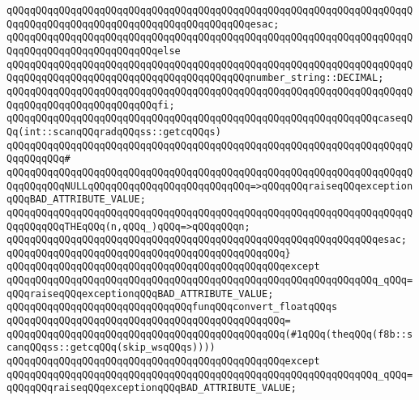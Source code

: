 \verb|qQQqqQQqqQQqqQQqqQQqqQQqqQQqqQQqqQQqqQQqqQQqqQQqqQQqqQQqqQQqqQQqqQQqqQQqqQQqqQQqqQQqqQQqqQQqqQQqqQQqqQQqqQQqqQQqesac;|\newline
\verb|qQQqqQQqqQQqqQQqqQQqqQQqqQQqqQQqqQQqqQQqqQQqqQQqqQQqqQQqqQQqqQQqqQQqqQQqqQQqqQQqqQQqqQQqqQQqqQQqelse|\newline
\verb|qQQqqQQqqQQqqQQqqQQqqQQqqQQqqQQqqQQqqQQqqQQqqQQqqQQqqQQqqQQqqQQqqQQqqQQqqQQqqQQqqQQqqQQqqQQqqQQqqQQqqQQqqQQqqQQqnumber_string::DECIMAL;|\newline
\verb|qQQqqQQqqQQqqQQqqQQqqQQqqQQqqQQqqQQqqQQqqQQqqQQqqQQqqQQqqQQqqQQqqQQqqQQqqQQqqQQqqQQqqQQqqQQqqQQqfi;|\newline
\newline
\verb|qQQqqQQqqQQqqQQqqQQqqQQqqQQqqQQqqQQqqQQqqQQqqQQqqQQqqQQqqQQqqQQqcaseqQQq(int::scanqQQqradqQQqss::getcqQQqs)|\newline
\verb|qQQqqQQqqQQqqQQqqQQqqQQqqQQqqQQqqQQqqQQqqQQqqQQqqQQqqQQqqQQqqQQqqQQqqQQqqQQqqQQq#|\newline
\verb|qQQqqQQqqQQqqQQqqQQqqQQqqQQqqQQqqQQqqQQqqQQqqQQqqQQqqQQqqQQqqQQqqQQqqQQqqQQqqQQqNULLqQQqqQQqqQQqqQQqqQQqqQQqqQQq=>qQQqqQQqraiseqQQqexceptionqQQqBAD_ATTRIBUTE_VALUE;|\newline
\verb|qQQqqQQqqQQqqQQqqQQqqQQqqQQqqQQqqQQqqQQqqQQqqQQqqQQqqQQqqQQqqQQqqQQqqQQqqQQqqQQqTHEqQQq(n,qQQq_)qQQq=>qQQqqQQqn;|\newline
\verb|qQQqqQQqqQQqqQQqqQQqqQQqqQQqqQQqqQQqqQQqqQQqqQQqqQQqqQQqqQQqqQQqesac;|\newline
\verb|qQQqqQQqqQQqqQQqqQQqqQQqqQQqqQQqqQQqqQQqqQQqqQQq}|\newline
\verb|qQQqqQQqqQQqqQQqqQQqqQQqqQQqqQQqqQQqqQQqqQQqqQQqexcept|\newline
\verb|qQQqqQQqqQQqqQQqqQQqqQQqqQQqqQQqqQQqqQQqqQQqqQQqqQQqqQQqqQQqqQQq_qQQq=qQQqraiseqQQqexceptionqQQqBAD_ATTRIBUTE_VALUE;|\newline
\newline
\verb|qQQqqQQqqQQqqQQqqQQqqQQqqQQqqQQqfunqQQqconvert_floatqQQqs|\newline
\verb|qQQqqQQqqQQqqQQqqQQqqQQqqQQqqQQqqQQqqQQqqQQqqQQq=|\newline
\verb|qQQqqQQqqQQqqQQqqQQqqQQqqQQqqQQqqQQqqQQqqQQqqQQq(#1qQQq(theqQQq(f8b::scanqQQqss::getcqQQq(skip_wsqQQqs))))|\newline
\verb|qQQqqQQqqQQqqQQqqQQqqQQqqQQqqQQqqQQqqQQqqQQqqQQqexcept|\newline
\verb|qQQqqQQqqQQqqQQqqQQqqQQqqQQqqQQqqQQqqQQqqQQqqQQqqQQqqQQqqQQqqQQq_qQQq=qQQqqQQqraiseqQQqexceptionqQQqBAD_ATTRIBUTE_VALUE;|\newline
